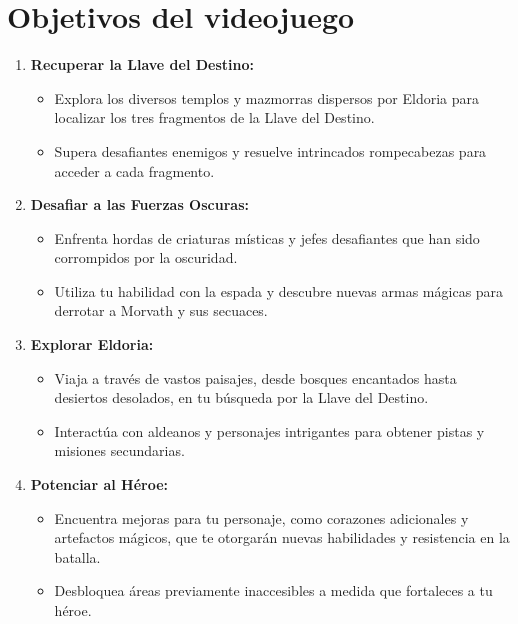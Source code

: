 \documentclass[a4paper]{article}
\begin{document}
    \section{Objetivos del videojuego}
    \begin{enumerate}
        \item \textbf{Recuperar la Llave del Destino:}
            \begin{itemize}
                \item Explora los diversos templos y mazmorras dispersos por Eldoria para localizar los tres fragmentos de la Llave del Destino.
                \item Supera desafiantes enemigos y resuelve intrincados rompecabezas para acceder a cada fragmento.
            \end{itemize}
    
        \item \textbf{Desafiar a las Fuerzas Oscuras:}
            \begin{itemize}
                \item Enfrenta hordas de criaturas místicas y jefes desafiantes que han sido corrompidos por la oscuridad.
                \item Utiliza tu habilidad con la espada y descubre nuevas armas mágicas para derrotar a Morvath y sus secuaces.
            \end{itemize}
    
        \item \textbf{Explorar Eldoria:}
            \begin{itemize}
                \item Viaja a través de vastos paisajes, desde bosques encantados hasta desiertos desolados, en tu búsqueda por la Llave del Destino.
                \item Interactúa con aldeanos y personajes intrigantes para obtener pistas y misiones secundarias.
            \end{itemize}
    
        \item \textbf{Potenciar al Héroe:}
            \begin{itemize}
                \item Encuentra mejoras para tu personaje, como corazones adicionales y artefactos mágicos, que te otorgarán nuevas habilidades y resistencia en la batalla.
                \item Desbloquea áreas previamente inaccesibles a medida que fortaleces a tu héroe.
            \end{itemize}
    

\end{enumerate}
\end{document}
